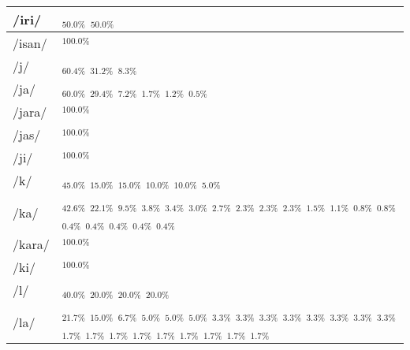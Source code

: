 \documentclass{article}
\begin{document}
\begin{longtable}{|l|p{}|}
/iri/ & \textIndus{}$_{50.0\%}$ \quad \textIndus{}$_{50.0\%}$ \\ \hline
/isan/ & \textIndus{}$_{100.0\%}$ \\ \hline
/j/ & \textIndus{}$_{60.4\%}$ \quad \textIndus{}$_{31.2\%}$ \quad \textIndus{}$_{8.3\%}$ \\ \hline
/ja/ & \textIndus{}$_{60.0\%}$ \quad \textIndus{}$_{29.4\%}$ \quad \textIndus{}$_{7.2\%}$ \quad \textIndus{}$_{1.7\%}$ \quad \textIndus{}$_{1.2\%}$ \quad \textIndus{}$_{0.5\%}$ \\ \hline
/jara/ & \textIndus{}$_{100.0\%}$ \\ \hline
/jas/ & \textIndus{}$_{100.0\%}$ \\ \hline
/ji/ & \textIndus{}$_{100.0\%}$ \\ \hline
/k/ & \textIndus{}$_{45.0\%}$ \quad \textIndus{}$_{15.0\%}$ \quad \textIndus{}$_{15.0\%}$ \quad \textIndus{}$_{10.0\%}$ \quad \textIndus{}$_{10.0\%}$ \quad \textIndus{}$_{5.0\%}$ \\ \hline
/ka/ & \textIndus{}$_{42.6\%}$ \quad \textIndus{}$_{22.1\%}$ \quad \textIndus{}$_{9.5\%}$ \quad \textIndus{}$_{3.8\%}$ \quad \textIndus{}$_{3.4\%}$ \quad \textIndus{}$_{3.0\%}$ \quad \textIndus{}$_{2.7\%}$ \quad \textIndus{}$_{2.3\%}$ \quad \textIndus{}$_{2.3\%}$ \quad \textIndus{}$_{2.3\%}$ \quad \textIndus{}$_{1.5\%}$ \quad \textIndus{}$_{1.1\%}$ \quad \textIndus{}$_{0.8\%}$ \quad \textIndus{}$_{0.8\%}$ \quad \textIndus{}$_{0.4\%}$ \quad \textIndus{}$_{0.4\%}$ \quad \textIndus{}$_{0.4\%}$ \quad \textIndus{}$_{0.4\%}$ \quad \textIndus{}$_{0.4\%}$ \\ \hline
/kara/ & \textIndus{}$_{100.0\%}$ \\ \hline
/ki/ & \textIndus{}$_{100.0\%}$ \\ \hline
/l/ & \textIndus{}$_{40.0\%}$ \quad \textIndus{}$_{20.0\%}$ \quad \textIndus{}$_{20.0\%}$ \quad \textIndus{}$_{20.0\%}$ \\ \hline
/la/ & \textIndus{}$_{21.7\%}$ \quad \textIndus{}$_{15.0\%}$ \quad \textIndus{}$_{6.7\%}$ \quad \textIndus{}$_{5.0\%}$ \quad \textIndus{}$_{5.0\%}$ \quad \textIndus{}$_{5.0\%}$ \quad \textIndus{}$_{3.3\%}$ \quad \textIndus{}$_{3.3\%}$ \quad \textIndus{}$_{3.3\%}$ \quad \textIndus{}$_{3.3\%}$ \quad \textIndus{}$_{3.3\%}$ \quad \textIndus{}$_{3.3\%}$ \quad \textIndus{}$_{3.3\%}$ \quad \textIndus{}$_{3.3\%}$ \quad \textIndus{}$_{1.7\%}$ \quad \textIndus{}$_{1.7\%}$ \quad \textIndus{}$_{1.7\%}$ \quad \textIndus{}$_{1.7\%}$ \quad \textIndus{}$_{1.7\%}$ \quad \textIndus{}$_{1.7\%}$ \quad \textIndus{}$_{1.7\%}$ \quad \textIndus{}$_{1.7\%}$ \quad \textIndus{}$_{1.7\%}$ \\ \hline

\end{longtable}
\end{document}
